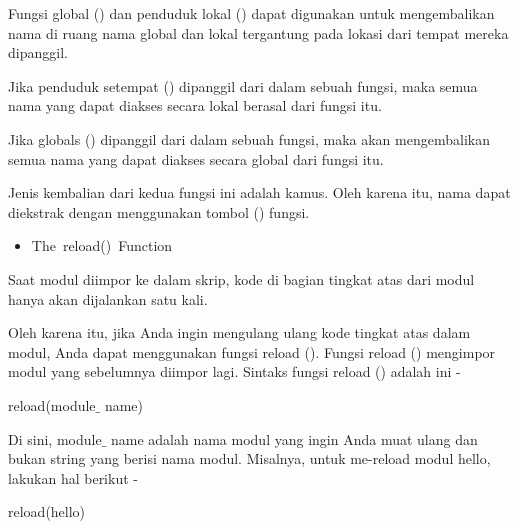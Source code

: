 \noindent Fungsi global () dan penduduk lokal () dapat digunakan untuk mengembalikan nama di ruang nama global dan lokal tergantung pada lokasi dari tempat mereka dipanggil.\par

\vspace{\baselineskip}
\noindent Jika penduduk setempat () dipanggil dari dalam sebuah fungsi, maka semua nama yang dapat diakses secara lokal berasal dari fungsi itu.\par
\vspace{\baselineskip}
\noindent Jika globals () dipanggil dari dalam sebuah fungsi, maka akan mengembalikan semua nama yang dapat diakses secara global dari fungsi itu.\par
\vspace{\baselineskip}
\noindent Jenis kembalian dari kedua fungsi ini adalah kamus. Oleh karena itu, nama dapat diekstrak dengan menggunakan tombol () fungsi.\par


\vspace{\baselineskip}
\begin{itemize}
	\item The reload() Function
\end{itemize}

\noindent Saat modul diimpor ke dalam skrip, kode di bagian tingkat atas dari modul hanya akan dijalankan satu kali.\par

\vspace{\baselineskip}
\noindent Oleh karena itu, jika Anda ingin mengulang ulang kode tingkat atas dalam modul, Anda dapat menggunakan fungsi reload (). Fungsi reload () mengimpor modul yang sebelumnya diimpor lagi. Sintaks fungsi reload () adalah ini -\par
\vspace{\baselineskip}
\noindent \hspace*{0.5in}reload(module$ \_ $ name)\par

\vspace{\baselineskip}
\noindent Di sini, module$ \_ $ name adalah nama modul yang ingin Anda muat ulang dan bukan string yang berisi nama modul. Misalnya, untuk me-reload modul hello, lakukan hal berikut -\par


\noindent \hspace*{0.5in}reload(hello)\par



